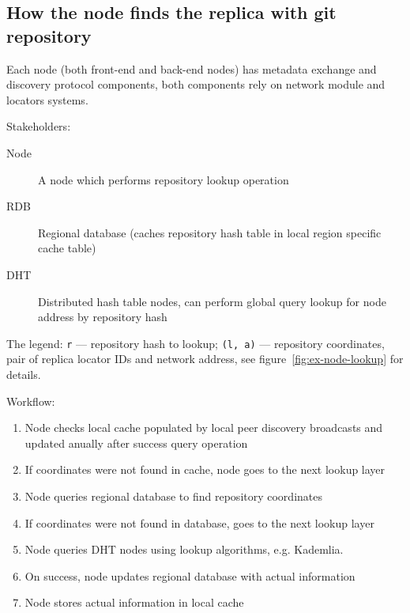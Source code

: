 \documentclass[nonacm=true]{acmart}
\newcommand{\code}[1]{\texttt{#1}}
\begin{document}
\subsection{How the node finds the replica with git repository}

Each node (both front-end and back-end nodes) has metadata exchange and discovery protocol components,
both components rely on network module and locators systems.

Stakeholders:
\begin{description}
  \item[Node] A node which performs repository lookup operation
  \item[RDB] Regional database (caches repository hash table in local region specific cache table)
  \item[DHT] Distributed hash table nodes, can perform global query lookup for node address by repository hash
\end{description}

The legend: \code{r} --- repository hash to lookup; \code{(l, a)} --- repository coordinates,
pair of replica locator IDs and network address, see figure~\ref{fig:ex-node-lookup} for details.

Workflow:
\begin{enumerate}
    \item Node checks local cache populated by local peer discovery broadcasts
      and updated anually after success query operation
    \item If coordinates were not found in cache, node goes to the next lookup layer
    \item Node queries regional database to find repository coordinates
    \item If coordinates were not found in database, goes to the next lookup layer
    \item Node queries DHT nodes using lookup algorithms, e.g. Kademlia.
    \item On success, node updates regional database with actual information
    \item Node stores actual information in local cache
\end{enumerate}
\end{document}

